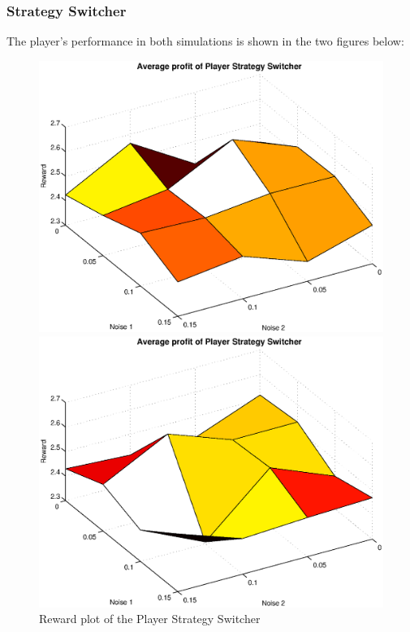 \documentclass[11pt,twoside]{article}
\begin{document}
\subsubsection{Strategy Switcher}
The player's performance in both simulations is shown in the two figures below:
\begin{figure}[h]

\begin{minipage}[hbt]{0.65\textwidth}
	\centering
	\includegraphics[width=\textwidth]{pics/simulation1/Reward_vs_Noise_of_Player_Strategy_Switcher}
\end{minipage}
\hfill
\begin{minipage}[hbt]{0.3\textwidth}
	\centering
	\includegraphics[width=\textwidth]{pics/simulation2/Reward_vs_Noise_of_Player_Strategy_Switcher}
\end{minipage}
	\caption{Reward plot of the Player Strategy Switcher}
	\label{pic player ss}
\end{figure}
\end{document}
